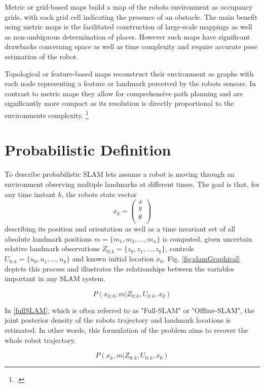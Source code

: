 Metric or grid-based maps build a map of the robots environment as occupancy grids, with each grid cell indicating the presence of an obstacle. The main benefit using metric maps is the facilitated construction of large-scale mappings as well as non-ambiguous determination of places. However such maps have significant drawbacks concerning space as well as time complexity and require accurate pose estimation of the robot.

Topological or feature-based maps reconstruct their environment as graphs with each node representing a feature or landmark perceived by the robots sensors. In contrast to metric maps they allow for comprehensive path planning and are significantly more compact as its resolution is directly proportional to the environments complexity. \footcite{thrunMaps1998}


\section{Probabilistic Definition}
To describe probabilistic SLAM lets assume a robot is moving through an environment observing multiple landmarks at different times. 
The goal is that, for any time instant $ k $, the robots state vector 
\[ x_{k} = 
\begin{pmatrix}
	x \\
	y \\
	\theta \\
\end{pmatrix}
\] describing its position and orientation as well as a time invariant set of all absolute landmark positions 
$ m = \{ m_{1}, m_{2}, ..., m_{n} \}$ 
is computed, given uncertain relative landmark observations $ Z_{0:k} = \{z_{0}, z_{1}, ..., z_{k}\}$, controls $ U_{0:k} = \{u_{0}, u_{1}, ..., u_{k}\}$ and known initial location $ x_{0} $. Fig. \ref{fig:slamGraphical} depicts this process and illustrates the relationships between the variables important in any SLAM system. 

\begin{equation}\label{fullSLAM}
	P(x_{k:0}, m | Z_{0:k}, U_{0:k}, x_{0})
\end{equation}

In \ref{fullSLAM}, which is often referred to as "Full-SLAM" or "Offline-SLAM", the joint posterior density of the robots trajectory and landmark locations is estimated. In other words, this formulation of the problem aims to recover the whole robot trajectory.

\begin{equation}\label{onlineSLAM}
	P(x_{k}, m | Z_{0:k}, U_{0:k}, x_{0})
\end{equation}

